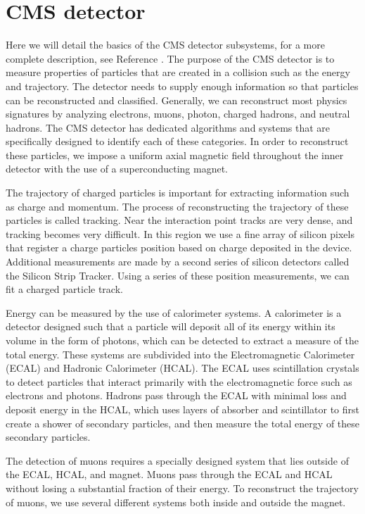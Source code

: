\section{CMS detector}
Here we will detail the basics of the CMS detector subsystems, for a more complete description, see Reference \cite{Bayatian:922757}.
The purpose of the CMS detector is to measure properties of particles that are created in a collision such as the energy and trajectory. 
The detector needs to supply enough information so that particles can be reconstructed and classified.  
Generally, we can reconstruct most physics signatures by analyzing electrons, muons, photon, charged hadrons, and neutral hadrons. 
The CMS detector has dedicated algorithms and systems that are specifically designed to identify each of these categories.  In order to reconstruct these particles, we impose a uniform axial magnetic field throughout the inner detector with the use of a superconducting magnet. 

The trajectory of charged particles is important for extracting information such as charge and momentum.  
The process of reconstructing the trajectory of these  particles is called tracking.  
Near the interaction point tracks are very dense, and tracking becomes very difficult.  
In this region we use a fine array of silicon pixels that register a charge particles position based on charge deposited in the device.  
Additional measurements are made by a second series of silicon detectors called the Silicon Strip Tracker. 
Using a series of these position measurements, we can fit a charged particle track.  

Energy can be measured by the use of calorimeter systems.  
A calorimeter is a detector designed such that a particle will deposit all of its energy within its volume in the form of photons, 
which can be detected to extract a measure of the total energy. 
These systems are subdivided into the Electromagnetic Calorimeter (ECAL) and Hadronic Calorimeter (HCAL).  
The ECAL uses scintillation crystals to detect particles that interact primarily with the electromagnetic force such as electrons and photons.  
Hadrons pass through the ECAL with minimal loss and deposit energy in the HCAL, which uses layers of absorber and scintillator to first 
create a shower of secondary particles, and then measure the total energy of these secondary particles.  

The detection of muons requires a specially designed system that lies outside of the ECAL, HCAL, and magnet.  
Muons pass through the ECAL and HCAL without losing a substantial fraction of their energy.  
To reconstruct the trajectory of muons, we use several different systems both inside and outside the magnet.

